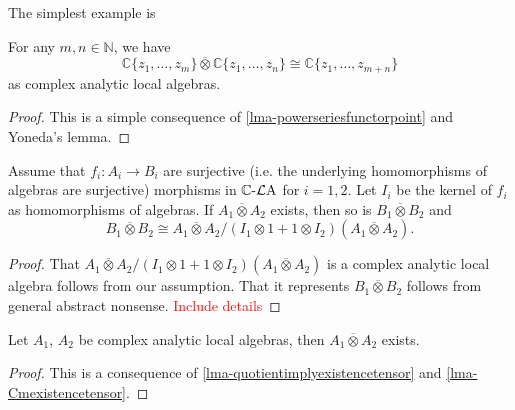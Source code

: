 The simplest example is 
\begin{lemma}\label{lma-Cmexistencetensor}
    For any $m,n\in \mathbb{N}$, we have
    \[
        \mathbb{C}\{ z_1,\ldots,z_m \}\overline{\otimes} \mathbb{C}\{ z_1,\ldots,z_n \}\cong  \mathbb{C}\{ z_1,\ldots,z_{m+n} \}
    \]
    as complex analytic local algebras.
\end{lemma}
\begin{proof}
    This is a simple consequence of \cref{lma-powerseriesfunctorpoint} and Yoneda's lemma.    
\end{proof}

\begin{lemma}\label{lma-quotientimplyexistencetensor}
    Assume that $f_i:A_i\rightarrow B_i$ are  surjective (i.e. the underlying homomorphisms of algebras are surjective) morphisms in $\mathbb{C}\text{-}\mathcal{L}\mathrm{A}$ for $i=1,2$. Let $I_i$ be the kernel of $f_i$ as homomorphisms of algebras.
    If $A_1\overline{\otimes} A_2$ exists, then so is $B_1 \overline{\otimes} B_2$ and
    \[
        B_1 \overline{\otimes} B_2\cong A_1\overline{\otimes} A_2/ (I_1\otimes 1+1\otimes I_2)(A_1\overline{\otimes} A_2).
    \]
\end{lemma}
\begin{proof}
    That $A_1\overline{\otimes} A_2/ (I_1\otimes 1+1\otimes I_2)(A_1\overline{\otimes} A_2)$ is a complex analytic local algebra follows from our assumption. That it represents  $B_1 \overline{\otimes} B_2$ follows from general abstract nonsense. \textcolor{red}{Include details}
\end{proof}

\begin{corollary}
    Let $A_1$, $A_2$ be complex analytic local algebras, then $A_1\overline{\otimes} A_2$ exists. 
\end{corollary}
\begin{proof}
    This is a consequence of \cref{lma-quotientimplyexistencetensor} and \cref{lma-Cmexistencetensor}.
\end{proof}

